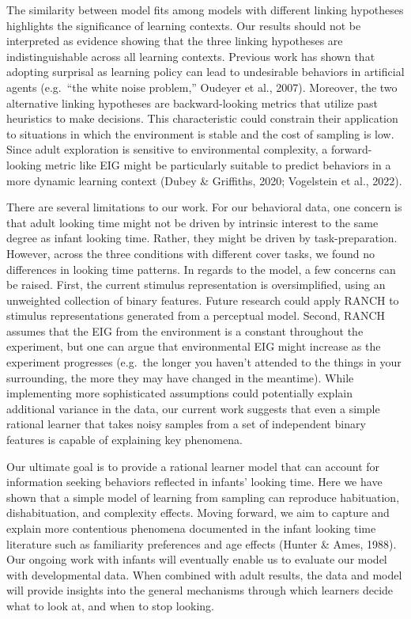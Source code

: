 \documentclass[10pt, letterpaper]{article}
\begin{document}
The similarity between model fits among models with different linking
hypotheses highlights the significance of learning contexts. Our results
should not be interpreted as evidence showing that the three linking
hypotheses are indistinguishable across all learning contexts. Previous
work has shown that adopting surprisal as learning policy can lead to
undesirable behaviors in artificial agents (e.g.~{``the white noise
problem,''} Oudeyer et al., 2007). Moreover, the two alternative linking
hypotheses are backward-looking metrics that utilize past heuristics to
make decisions. This characteristic could constrain their application to
situations in which the environment is stable and the cost of sampling
is low. Since adult exploration is sensitive to environmental
complexity, a forward-looking metric like EIG might be particularly
suitable to predict behaviors in a more dynamic learning context (Dubey
\& Griffiths, 2020; Vogelstein et al., 2022).

There are several limitations to our work. For our behavioral data, one
concern is that adult looking time might not be driven by intrinsic
interest to the same degree as infant looking time. Rather, they might
be driven by task-preparation. However, across the three conditions with
different cover tasks, we found no differences in looking time patterns.
In regards to the model, a few concerns can be raised. First, the
current stimulus representation is oversimplified, using an unweighted
collection of binary features. Future research could apply RANCH to
stimulus representations generated from a perceptual model. Second,
RANCH assumes that the EIG from the environment is a constant throughout
the experiment, but one can argue that environmental EIG might increase
as the experiment progresses (e.g.~the longer you haven't attended to
the things in your surrounding, the more they may have changed in the
meantime). While implementing more sophisticated assumptions could
potentially explain additional variance in the data, our current work
suggests that even a simple rational learner that takes noisy samples
from a set of independent binary features is capable of explaining key
phenomena.

Our ultimate goal is to provide a rational learner model that can
account for information seeking behaviors reflected in infants' looking
time. Here we have shown that a simple model of learning from sampling
can reproduce habituation, dishabituation, and complexity effects.
Moving forward, we aim to capture and explain more contentious phenomena
documented in the infant looking time literature such as familiarity
preferences and age effects (Hunter \& Ames, 1988). Our ongoing work
with infants will eventually enable us to evaluate our model with
developmental data. When combined with adult results, the data and model
will provide insights into the general mechanisms through which learners
decide what to look at, and when to stop looking.
\end{document}

